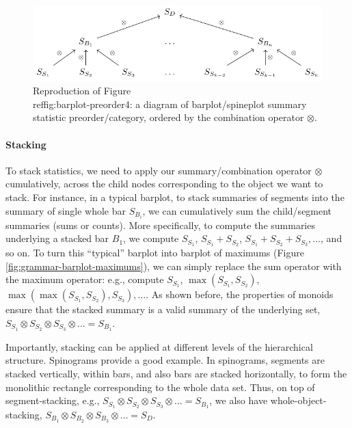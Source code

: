 \documentclass[
]{book}
\theoremstyle{definition}
\theoremstyle{definition}
\theoremstyle{definition}
\theoremstyle{definition}
\theoremstyle{remark}
\begin{document}
\begin{figure}

{\centering \includegraphics[width=1\linewidth,height=1\textheight]{./figures/barplot-preorder4} 

}

\caption{Reproduction of Figure \\ref{fig:barplot-preorder4}: a diagram of barplot/spineplot summary statistic preorder/category, ordered by the combination operator $\otimes$.}\label{fig:unnamed-chunk-33}
\end{figure}

\paragraph{Stacking}\label{stacking}

To stack statistics, we need to apply our summary/combination operator \(\otimes\) cumulatively, across the child nodes corresponding to the object we want to stack. For instance, in a typical barplot, to stack summaries of segments into the summary of single whole bar \(S_{B_i}\), we can cumulatively sum the child/segment summaries (sums or counts). More specifically, to compute the summaries underlying a stacked bar \(B_1\), we compute \(S_{S_1}\), \(S_{S_1} + S_{S_2}\), \(S_{S_1} + S_{S_2} + S_{S_3}, \ldots\), and so on. To turn this ``typical'' barplot into barplot of maximums (Figure \ref{fig:grammar-barplot-maximums}), we can simply replace the sum operator with the maximum operator: e.g., compute \(S_{S_1}\), \(\max(S_{S_1}, S_{S_2})\), \(\max(\max(S_{S_1}, S_{S_2}), S_{S_3}), \ldots\). As shown before, the properties of monoids ensure that the stacked summary is a valid summary of the underlying set, \(S_{S_1} \otimes S_{S_2} \otimes S_{S_3} \otimes \ldots = S_{B_1}\).

Importantly, stacking can be applied at different levels of the hierarchical structure. Spinograms provide a good example. In spinograms, segments are stacked vertically, within bars, and also bars are stacked horizontally, to form the monolithic rectangle corresponding to the whole data set. Thus, on top of segment-stacking, e.g., \(S_{S_1} \otimes S_{S_2} \otimes S_{S_3} \otimes \ldots = S_{B_1}\), we also have whole-object-stacking, \(S_{B_1} \otimes S_{B_2} \otimes S_{B_3} \otimes \ldots = S_{D}\).
\end{document}
